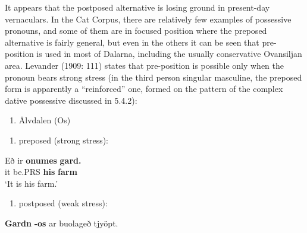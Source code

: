 It appears that the postposed alternative is losing ground in present-day vernaculars. In the Cat Corpus, there are relatively few examples of possessive pronouns, and some of them are in focused position where the preposed alternative is fairly general, but even in the others it can be seen that pre-position is used in most of Dalarna, including the usually conservative Ovansiljan area. Levander (1909: 111) states that pre-position is possible only when the pronoun bears strong stress (in the third person singular masculine, the preposed form is apparently a “reinforced” one, formed on the pattern of the complex dative possessive discussed in 5.4.2):

\begin{enumerate} %
\item 
Älvdalen (Os)

\end{enumerate} %
\setcounter{listLFOxcviiileveli}{0}
\begin{enumerate} %
\item 
preposed (strong stress):

\end{enumerate} %
\ea\label{}
\gll Eð  ir  \textbf{onumes} \textbf{gard.}\\


it  be.PRS  \textbf{his} \textbf{farm}\\ %


‘It is his farm.’
\z


\begin{enumerate} %
\item 
postposed (weak stress):

\end{enumerate} %
\ea\label{}
\gll \textbf{Gardn}\textbf{  {}-os} ar  buolageð  tjyöpt.\\


